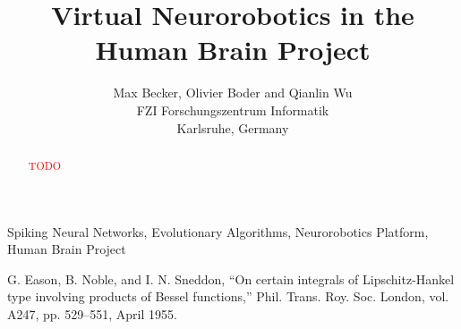 \documentclass[conference]{IEEEtran}
\newcommand\todo[1]{\textcolor{red}{TODO #1}}
\begin{document}
\title{Virtual Neurorobotics in the Human Brain Project}
\author{Max Becker, Olivier Boder and Qianlin Wu\\FZI Forschungszentrum Informatik\\Karlsruhe, Germany}

\maketitle
\thispagestyle{plain}
\pagestyle{plain}

\begin{abstract}
\todo{}
\end{abstract}

\begin{IEEEkeywords}
Spiking Neural Networks, Evolutionary Algorithms, Neurorobotics Platform, Human Brain Project
\end{IEEEkeywords}












\begin{thebibliography}{00}
 G. Eason, B. Noble, and I. N. Sneddon, ``On certain integrals of Lipschitz-Hankel type involving products of Bessel functions,'' Phil. Trans. Roy. Soc. London, vol. A247, pp. 529--551, April 1955.
\end{thebibliography}
\end{document}
